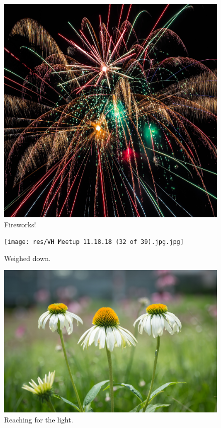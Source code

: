 \documentclass{report}
\begin{document}
\begin{figure}
  \includegraphics[width=\linewidth]{res/fireworks.jpg}
  \caption{Fireworks!}
\end{figure}

\begin{figure}
  \texttt{[image: res/VH Meetup 11.18.18 (32 of 39).jpg.jpg]}
  \caption{Weighed down.}
\end{figure}

\begin{figure}
  \includegraphics[width=\linewidth]{res/symmetricalflowers.jpg}
  \caption{Reaching for the light.}
\end{figure}
\end{document}
